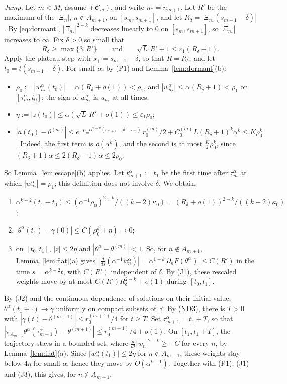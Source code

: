 \documentclass[11pt]{article}
\theoremstyle{definition}
\theoremstyle{remark}
\newcommand{\R}{\mathbb{R}}
\newcommand{\eps}{\varepsilon}
\newcommand{\ND}[1]{\textup{(ND#1)}}
\begin{document}
\emph{Jump.} Let $m<M$, assume $(\mathcal C_m)$, and write $n_*=n_{m+1}$. Let $R'$ be the maximum of the $|\Xi_n|$, $n\notin A_{m+1}$, on $[s_m,s_{m+1}]$, and let $R_\delta=|\Xi_{n_*}(s_{m+1}-\delta)|$. By \eqref{eq:dormant}, $|\Xi_{n_*}|^{2-k}$ decreases linearly to $0$ on $[s_m,s_{m+1}]$, so $|\Xi_{n_*}|$ increases to $\infty$. Fix $\delta>0$ so small that
\[
R_\delta\ge\max\{3,R'\}\qquad\text{and}\qquad\sqrt L\,R'+1\le\eps_1(R_\delta-1).
\]
Apply the plateau step with $s_+=s_{m+1}-\delta$, so that $R=R_\delta$, and let $t_0=t(s_{m+1}-\delta)$. For small $\alpha$, by (P1) and Lemma~\ref{lem:dormant}(b):
\begin{itemize}[nosep]
\item $\rho_0:=|w^\alpha_{n_*}(t_0)|=\alpha(R_\delta+o(1))<\rho_1$, and $|w^\alpha_{n_*}|\le\alpha(R_\delta+1)<\rho_1$ on $[\tau^\alpha_m,t_0]$; the sign of $w^\alpha_{n_*}$ is $u_{n_*}$ at all times;
\item $\eta:=|z(t_0)|\le\alpha(\sqrt L\,R'+o(1))\le\eps_1\rho_0$;
\item $|a(t_0)-\theta^{(m)}|\le e^{-\mu_m\alpha^{2-k}(s_{m+1}-\delta-s_m)}\,r^{(m)}_0/2+C^{(m)}_0L(R_\delta+1)^k\alpha^k\le K\rho_0^k$. Indeed, the first term is $o(\alpha^k)$, and the second is at most $\frac K2\rho_0^k$, since $(R_\delta+1)\alpha\le2(R_\delta-1)\alpha\le2\rho_0$.
\end{itemize}
So Lemma~\ref{lem:escape}(b) applies. Let $t^\alpha_{m+1}:=t_1$ be the first time after $\tau^\alpha_m$ at which $|w^\alpha_{n_*}|=\rho_1$; this definition does not involve $\delta$. We obtain:
\begin{enumerate}[label=(J\arabic*),leftmargin=3em,nosep]
\item $\alpha^{k-2}(t_1-t_0)\le(\alpha^{-1}\rho_0)^{2-k}/((k-2)\kappa_0)=(R_\delta+o(1))^{2-k}/((k-2)\kappa_0)$;
\item $|\theta^\alpha(t_1)-\gamma(0)|\le C(\rho_0^k+\eta)\to0$;
\item on $[t_0,t_1]$, $|z|\le2\eta$ and $|\theta^\alpha-\theta^{(m)}|<1$. So, for $n\notin A_{m+1}$, Lemma~\ref{lem:flat}(a) gives $|\frac{d}{ds}(\alpha^{-1}w^\alpha_n)|=\alpha^{1-k}|\partial_nF(\theta^\alpha)|\le C(R')$ in the time $s=\alpha^{k-2}t$, with $C(R')$ independent of $\delta$. By (J1), these rescaled weights move by at most $C(R')R_\delta^{2-k}+o(1)$ during $[t_0,t_1]$.
\end{enumerate}
By (J2) and the continuous dependence of solutions on their initial value, $\theta^\alpha(t_1+\cdot)\to\gamma$ uniformly on compact subsets of $\R$. By \ND3, there is $T>0$ with $|\gamma(t)-\theta^{(m+1)}|\le r^{(m+1)}_0/4$ for $t\ge T$. Set $\tau^\alpha_{m+1}=t_1+T$, so that $|\pi_{A_{m+1}}\theta^\alpha(\tau^\alpha_{m+1})-\theta^{(m+1)}|\le r^{(m+1)}_0/4+o(1)$. On $[t_1,t_1+T]$, the trajectory stays in a bounded set, where $\frac{d}{dt}|w_n|^{2-k}\ge-C$ for every $n$, by Lemma~\ref{lem:flat}(a). Since $|w^\alpha_n(t_1)|\le2\eta$ for $n\notin A_{m+1}$, these weights stay below $4\eta$ for small $\alpha$, hence they move by $O(\alpha^{k-1})$. Together with (P1), (J1) and (J3), this gives, for $n\notin A_{m+1}$,
\end{document}

